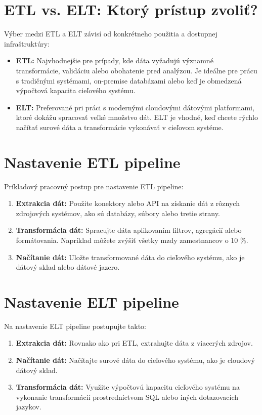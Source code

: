 \documentclass{article}
\begin{document}
\section{ETL vs. ELT: Ktorý prístup zvoliť?}

Výber medzi ETL a ELT závisí od konkrétneho použitia a dostupnej infraštruktúry:

\begin{itemize}
    \item \textbf{ETL:} Najvhodnejšie pre prípady, kde dáta vyžadujú významné transformácie, validáciu alebo obohatenie pred analýzou. Je ideálne pre prácu s tradičnými systémami, on-premise databázami alebo keď je obmedzená výpočtová kapacita cieľového systému.
    \item \textbf{ELT:} Preferované pri práci s modernými cloudovými dátovými platformami, ktoré dokážu spracovať veľké množstvo dát. ELT je vhodné, keď chcete rýchlo načítať surové dáta a transformácie vykonávať v cieľovom systéme.
\end{itemize}

\section{Nastavenie ETL pipeline}

Príkladový pracovný postup pre nastavenie ETL pipeline:

\begin{enumerate}
    \item \textbf{Extrakcia dát:} Použite konektory alebo API na získanie dát z rôznych zdrojových systémov, ako sú databázy, súbory alebo tretie strany.
    \item \textbf{Transformácia dát:} Spracujte dáta aplikovaním filtrov, agregácií alebo formátovania. Napríklad môžete zvýšiť všetky mzdy zamestnancov o 10 \%.
    \item \textbf{Načítanie dát:} Uložte transformované dáta do cieľového systému, ako je dátový sklad alebo dátové jazero.
\end{enumerate}

\section{Nastavenie ELT pipeline}

Na nastavenie ELT pipeline postupujte takto:

\begin{enumerate}
    \item \textbf{Extrakcia dát:} Rovnako ako pri ETL, extrahujte dáta z viacerých zdrojov.
    \item \textbf{Načítanie dát:} Načítajte surové dáta do cieľového systému, ako je cloudový dátový sklad.
    \item \textbf{Transformácia dát:} Využite výpočtovú kapacitu cieľového systému na vykonanie transformácií prostredníctvom SQL alebo iných dotazovacích jazykov.
\end{enumerate}
\end{document}

